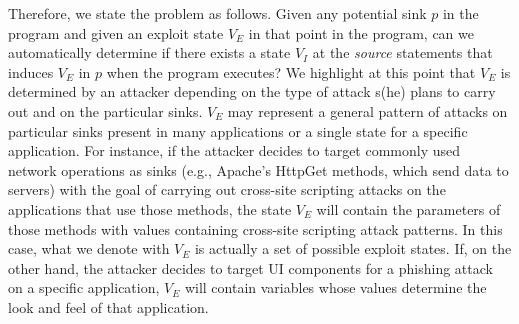 
Therefore, we state the problem as follows. Given any potential sink $p$ in the program and given an exploit state $V_E$ in that point in the program, can we automatically determine if there exists a state $V_I$ at the \textit{source} statements that induces $V_E$ in $p$ when the program executes? 
{\color{orange} We highlight at this point that $V_E$ is determined by an attacker depending on the type of attack s(he) plans to carry out and on the particular sinks.} {\color{blue} $V_E$ may represent a general pattern of attacks on particular sinks present in many applications or a single state for a specific application. For instance, if the attacker decides to target commonly used network operations as sinks (e.g., Apache's HttpGet methods, which send data to servers) with the goal of carrying out cross-site scripting attacks on the applications that use those methods, the state $V_E$ will contain the parameters of those methods with values containing cross-site scripting attack patterns. In this case, what we denote with $V_E$ is actually a set of possible exploit states. If, on the other hand, the attacker decides to target UI components for a phishing attack on a specific application, $V_E$ will contain variables whose values determine the look and feel of that application.}


